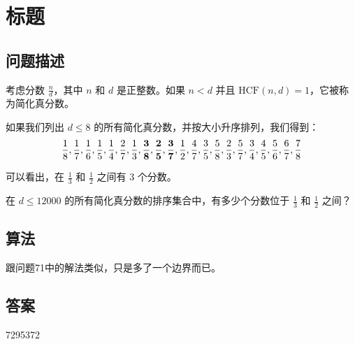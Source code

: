 \section{标题}
\subsection{问题描述}
\begin{tcolorbox}
	考虑分数 \( \frac{n}{d} \)，其中 \( n \) 和 \( d \) 是正整数。如果 \( n < d \) 并且 \( \text{HCF}(n, d) = 1 \)，它被称为简化真分数。

	如果我们列出 \( d \leq 8 \) 的所有简化真分数，并按大小升序排列，我们得到：
	\[ \frac{1}{8}, \frac{1}{7}, \frac{1}{6}, \frac{1}{5}, \frac{1}{4}, \frac{2}{7}, \frac{1}{3}, \frac{\bf 3}{\bf 8},
		\frac{\bf 2}{\bf 5}, \frac{\bf 3}{\bf 7}, \frac{1}{2}, \frac{4}{7}, \frac{3}{5}, \frac{5}{8}, \frac{2}{3}, \frac{5}{7}, \frac{3}{4}, \frac{4}{5}, \frac{5}{6}, \frac{6}{7}, \frac{7}{8} \]

	可以看出，在 \( \frac{1}{3} \) 和 \( \frac{1}{2} \) 之间有 3 个分数。

	在 \( d \leq 12000 \) 的所有简化真分数的排序集合中，有多少个分数位于 \( \frac{1}{3} \) 和 \( \frac{1}{2} \) 之间？
\end{tcolorbox}

\subsection{算法}
跟问题71中的解法类似，只是多了一个边界而已。

\subsection{答案}
7295372
